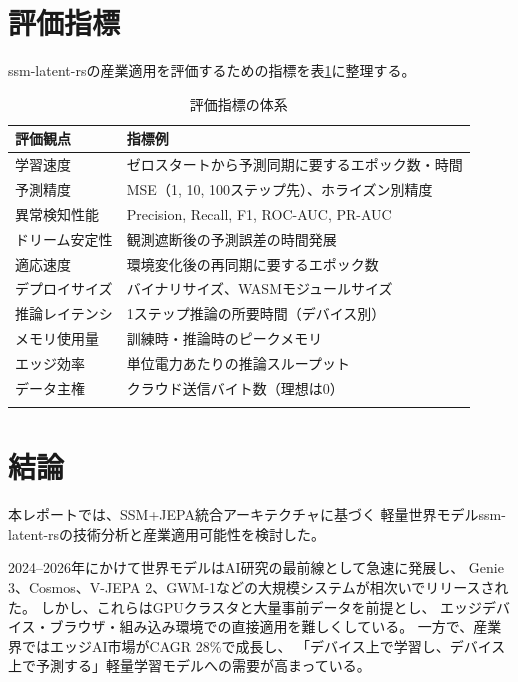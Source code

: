 \documentclass[11pt,a4paper]{ltjsarticle}
\begin{document}
\section{評価指標}

ssm-latent-rsの産業適用を評価するための指標を表\ref{tab:metrics}に整理する。

\begin{longtable}{p{30mm}p{105mm}}
\toprule
評価観点 & 指標例 \\
\midrule
\endhead
学習速度 & ゼロスタートから予測同期に要するエポック数・時間 \\
予測精度 & MSE（1, 10, 100ステップ先）、ホライズン別精度 \\
異常検知性能 & Precision, Recall, F1, ROC-AUC, PR-AUC \\
ドリーム安定性 & 観測遮断後の予測誤差の時間発展 \\
適応速度 & 環境変化後の再同期に要するエポック数 \\
デプロイサイズ & バイナリサイズ、WASMモジュールサイズ \\
推論レイテンシ & 1ステップ推論の所要時間（デバイス別） \\
メモリ使用量 & 訓練時・推論時のピークメモリ \\
エッジ効率 & 単位電力あたりの推論スループット \\
データ主権 & クラウド送信バイト数（理想は0） \\
\bottomrule
\caption{評価指標の体系}
\label{tab:metrics}
\end{longtable}

\section{結論}

本レポートでは、SSM+JEPA統合アーキテクチャに基づく
軽量世界モデルssm-latent-rsの技術分析と産業適用可能性を検討した。

2024--2026年にかけて世界モデルはAI研究の最前線として急速に発展し、
Genie 3、Cosmos、V-JEPA 2、GWM-1などの大規模システムが相次いでリリースされた。
しかし、これらはGPUクラスタと大量事前データを前提とし、
エッジデバイス・ブラウザ・組み込み環境での直接適用を難しくしている。
一方で、産業界ではエッジAI市場がCAGR 28\%で成長し、
「デバイス上で学習し、デバイス上で予測する」軽量学習モデルへの需要が高まっている。
\end{document}
